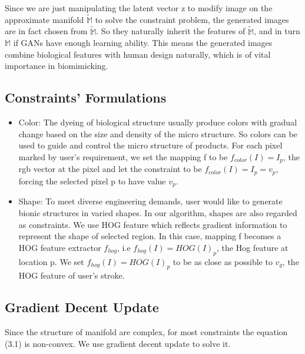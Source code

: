 Since we are just manipulating the latent vector z to modify image on the approximate manifold $\widetilde{\mathbb{M}}$ to solve the constraint problem, the generated images are in fact chosen from $\widetilde{\mathbb{M}}$. So they naturally inherit the features of $\widetilde{\mathbb{M}}$, and in turn $\mathbb{M}$ if GANs have enough learning ability. This means the generated images combine biological features with human design naturally, which is of vital importance in biomimicking. 

\subsection{Constraints' Formulations}
\begin{itemize}
\item Color: The dyeing of biological structure usually produce colors with gradual change based on the size and density of the micro structure. So colors can be used to guide and control the micro structure of products. For each pixel marked by user's requirement, we set the mapping f to be $f_{color}(I) = I_p$, the rgb vector at the pixel and let the constraint to be $f_{color}(I) = I_p=v_p$, forcing the selected pixel p to have value $v_p$.\

\item Shape: To meet diverse engineering demands, user would like to generate bionic structures in varied shapes. In our algorithm, shapes are also regarded as constraints. We use HOG feature which reflects gradient information to represent the shape of selected region. In this case, mapping f becomes a HOG feature extractor $f_{hog}$, i.e $f_{hog}(I)=HOG(I)_p$, the Hog feature at location p. We set $f_{hog}(I) = HOG(I)_p$ to be as close as possible to $v_g$, the HOG feature of user’s stroke.
\end{itemize}
\subsection{Gradient Decent Update}
Since the structure of manifold are complex, for most constraints the equation (3.1) is non-convex. We use gradient decent update to solve it. 